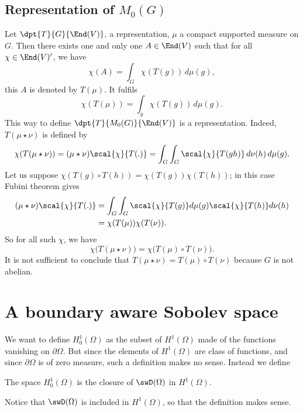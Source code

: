 \subsection{Representation of \texorpdfstring{$M_0(G)$}{M0G}}

Let $\dpt{T}{G}{\End(V)}$, a representation, $\mu$ a compact supported measure on $G$. Then there exists one and only one $A\in\End(V)$ such that for all $\chi\in\End(V)'$, we have
\begin{equation}
	\chi(A)=\int_G\chi(T(g))\,d\mu(g),
\end{equation}
this $A$ is denoted by $T(\mu)$. It fulfils
\begin{equation}
	\chi(T(\mu))=\int_g\chi(T(g))\,d\mu(g).
\end{equation}
This way to define $\dpt{T}{M_0(G)}{\End(V)}$ is a representation. Indeed, $T(\mu\star\nu)$ is defined by
\begin{equation}
	\chi(T(\mu\star\nu))	=(\mu\star\nu)\scal{\chi}{T(.)}
	=\int_G\int_G\scal{\chi}{T(gh)}\,d\nu(h)\,d\mu(g).
\end{equation}
Let us suppose $\chi(T(g)\circ T(h))=\chi(T(g))\chi(T(h))$; in this case Fubini theorem gives
\begin{equation}
	\begin{split}
		(\mu\star\nu)\scal{\chi}{T(.)} & =\int_G\int_G\scal{\chi}{T(g)}d\mu(g)\scal{\chi}{T(h)}d\nu(h) \\
		                               & =\chi(T(\mu))\chi(T(\nu)).
	\end{split}
\end{equation}
So for all such $\chi$, we have
\[
	\chi\big(T(\mu\star\nu)\big)=\chi\big(T(\mu)\circ T(\nu)\big).
\]
It is not sufficient to conclude that $T(\mu\star\nu)=T(\mu)\circ T(\nu)$ because $G$ is not abelian.

\section{A boundary aware Sobolev space}

We want to define \( H_0^1(\Omega)\) as the subset of \( H^1(\Omega)\) made of the functions vanishing on \( \partial \Omega\).  But since the elements of \( H^1(\Omega)\) are class of functions, and since \( \partial\Omega\) is of zero measure, such a definition makes no sense. Instead we define
\begin{definition}      \label{DEFooFICWooBWCDyO}
	The space \( H^1_0(\Omega)\) is the closure of \( \swD(\Omega)\) in \( H^1(\Omega)\).
\end{definition}
Notice that \( \swD(\Omega)\) is included in \( H^1(\Omega)\), so that the definition makes sense.

